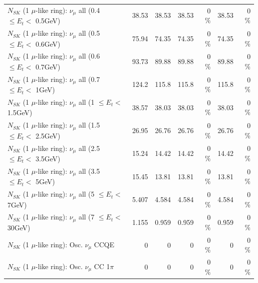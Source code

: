 \begin{table}
\begin{tabular}{| l | r | r | r  r | r  r |}
       $N_{SK}$ (1 $\mu$-like ring): $\nu_{\mu}$ all (0.4 $\leq E_{t} <$ 0.5GeV) &           38.53 &           38.53 &           38.53 &        0 \%  &           38.53 &        0 \%  \\ 
       $N_{SK}$ (1 $\mu$-like ring): $\nu_{\mu}$ all (0.5 $\leq E_{t} <$ 0.6GeV) &           75.94 &           74.35 &           74.35 &        0 \%  &           74.35 &        0 \%  \\ 
       $N_{SK}$ (1 $\mu$-like ring): $\nu_{\mu}$ all (0.6 $\leq E_{t} <$ 0.7GeV) &           93.73 &           89.88 &           89.88 &        0 \%  &           89.88 &        0 \%  \\ 
         $N_{SK}$ (1 $\mu$-like ring): $\nu_{\mu}$ all (0.7 $\leq E_{t} <$ 1GeV) &           124.2 &           115.8 &           115.8 &        0 \%  &           115.8 &        0 \%  \\ 
         $N_{SK}$ (1 $\mu$-like ring): $\nu_{\mu}$ all (1 $\leq E_{t} <$ 1.5GeV) &           38.57 &           38.03 &           38.03 &        0 \%  &           38.03 &        0 \%  \\ 
       $N_{SK}$ (1 $\mu$-like ring): $\nu_{\mu}$ all (1.5 $\leq E_{t} <$ 2.5GeV) &           26.95 &           26.76 &           26.76 &        0 \%  &           26.76 &        0 \%  \\ 
       $N_{SK}$ (1 $\mu$-like ring): $\nu_{\mu}$ all (2.5 $\leq E_{t} <$ 3.5GeV) &           15.24 &           14.42 &           14.42 &        0 \%  &           14.42 &        0 \%  \\ 
         $N_{SK}$ (1 $\mu$-like ring): $\nu_{\mu}$ all (3.5 $\leq E_{t} <$ 5GeV) &           15.45 &           13.81 &           13.81 &        0 \%  &           13.81 &        0 \%  \\ 
           $N_{SK}$ (1 $\mu$-like ring): $\nu_{\mu}$ all (5 $\leq E_{t} <$ 7GeV) &           5.407 &           4.584 &           4.584 &        0 \%  &           4.584 &        0 \%  \\ 
          $N_{SK}$ (1 $\mu$-like ring): $\nu_{\mu}$ all (7 $\leq E_{t} <$ 30GeV) &           1.155 &           0.959 &           0.959 &        0 \%  &           0.959 &        0 \%  \\ 
\hline
\hline
                               $N_{SK}$ (1 $\mu$-like ring): Osc. $\nu_\mu$ CCQE &               0 &               0 &               0 &        0 \%  &               0 &        0 \%  \\ 
                          $N_{SK}$ (1 $\mu$-like ring): Osc. $\nu_\mu$ CC 1$\pi$ &               0 &               0 &               0 &        0 \%  &               0 &        0 \%  \\ 

\end{tabular}
\end{table}
